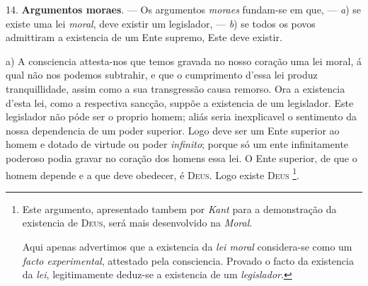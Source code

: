 14. \textbf{Argumentos moraes}. --- Os argumentos \emph{moraes} fundam-se em que, --- \emph{a}) se existe uma lei \emph{moral}, deve existir um legislador, --- \emph{b}) se todos os povos admittiram a existencia de um Ente supremo, Este deve existir.

a) A consciencia attesta-nos que temos gravada no nosso coração uma lei moral, á qual não nos podemos subtrahir, e que o cumprimento d'essa lei produz tranquillidade, assim como a sua transgressão causa remorso. Ora a existencia d'esta lei, como a respectiva sancção, suppõe a existencia de um legislador. Este legislador não póde ser o proprio homem; aliás seria inexplicavel o sentimento da nossa dependencia de um poder superior. Logo deve ser um Ente superior ao homem e dotado de virtude ou poder \emph{infinito}; porque só um ente infinitamente poderoso podia gravar no coração dos homens essa lei. O Ente superior, de que o homem depende e a que deve obedecer, é \textsc{Deus}. Logo existe \textsc{Deus} \footnote{Este argumento, apresentado tambem por \emph{Kant} para a demonstração da existencia de \textsc{Deus}, será mais desenvolvido na \emph{Moral}.\par Aqui apenas advertimos que a existencia da \emph{lei moral} considera-se como um \emph{facto experimental}, attestado pela consciencia. Provado o facto da existencia da \emph{lei}, legitimamente deduz-se a existencia de um \emph{legislador}.}.
